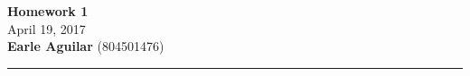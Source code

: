 \documentclass[11pt, letterpaper, onecolumn]{article}
\newcommand{\hwRuleWidth}{0.4pt}
\numberwithin{equation}{hwProblemCounter}
\numberwithin{figure}{hwProblemCounter}
\newcommand{\hwTitle}{Homework 1}
\newcommand{\hwDueDate}{April 19, 2017}
\newcommand{\hwAuthor}{Earle Aguilar}
\newcommand{\hwSection}{804501476}
\begin{document}
{\centering
  \Large{\textbf{\hwTitle}}\\
  \vspace{0.1in}\normalsize{\hwDueDate}\\
  \vspace{0.1in}\textbf{\hwAuthor} (\hwSection)\\
  \vspace{0.1in}\rule{\textwidth}{\hwRuleWidth}}\\


\newcommand{\msum}{\displaystyle \sum}
\newcommand{\betah}{\hat{\beta}}
\newcommand{\pmatb}{\begin{pmatrix}}
\newcommand{\pmate}{\end{pmatrix}}
\end{document}
